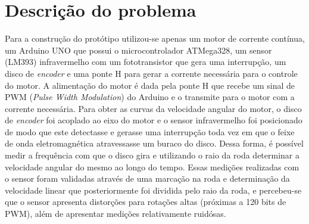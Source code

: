\documentclass{article}
\begin{document}
\section{Descrição do problema}
Para a construção do protótipo utilizou-se apenas um motor de corrente contínua, um Arduino UNO que possui o microcontrolador ATMega328, um sensor (LM393) infravermelho com um fototransistor que gera uma interrupção, um disco de \textit{encoder} e uma ponte H para gerar a corrente necessária para o controle do motor.
A alimentação do motor é dada pela ponte H que recebe um sinal de PWM (\textit{Pulse Width Modulation}) do Arduino e o transmite para o motor com a corrente necessária.
Para obter as curvas da velocidade angular do motor, o disco de \textit{encoder} foi acoplado ao eixo do motor e o sensor infravermelho foi posicionado de modo que este detectasse e gerasse uma interrupção toda vez em que o feixe de onda eletromagnética atravessasse um buraco do disco. Dessa forma, é possível medir a frequência com que o disco gira e utilizando o raio da roda determinar a velocidade angular do mesmo ao longo do tempo. Essas medições realizadas com o sensor foram validadas através de uma marcação na roda e determinação da velocidade linear que posteriormente foi dividida pelo raio da roda, e percebeu-se que o sensor apresenta distorções para rotações altas (próximas a 120 bits de PWM), além de apresentar medições relativamente ruidósas.
\end{document}
